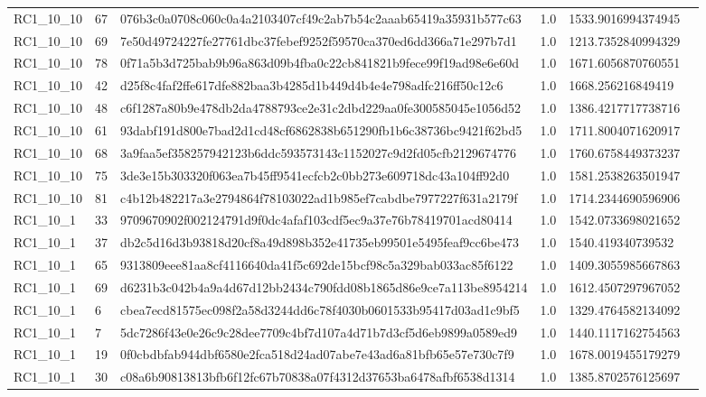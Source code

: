 \begin{tabular}{llllll}
 RC1\_10\_10 & 67 & 076b3c0a0708c060c0a4a2103407cf49c2ab7b54c2aaab65419a35931b577c63 & 1.0 & 1533.9016994374945 &  \\
 RC1\_10\_10 & 69 & 7e50d49724227fe27761dbc37febef9252f59570ca370ed6dd366a71e297b7d1 & 1.0 & 1213.7352840994329 &  \\
 RC1\_10\_10 & 78 & 0f71a5b3d725bab9b96a863d09b4fba0c22cb841821b9fece99f19ad98e6e60d & 1.0 & 1671.6056870760551 &  \\
 RC1\_10\_10 & 42 & d25f8c4faf2ffe617dfe882baa3b4285d1b449d4b4e4e798adfc216ff50c12c6 & 1.0 & 1668.256216849419 &  \\
 RC1\_10\_10 & 48 & c6f1287a80b9e478db2da4788793ce2e31c2dbd229aa0fe300585045e1056d52 & 1.0 & 1386.4217717738716 &  \\
 RC1\_10\_10 & 61 & 93dabf191d800e7bad2d1cd48cf6862838b651290fb1b6c38736bc9421f62bd5 & 1.0 & 1711.8004071620917 &  \\
 RC1\_10\_10 & 68 & 3a9faa5ef358257942123b6ddc593573143c1152027c9d2fd05cfb2129674776 & 1.0 & 1760.6758449373237 &  \\
 RC1\_10\_10 & 75 & 3de3e15b303320f063ea7b45ff9541ecfcb2c0bb273e609718dc43a104ff92d0 & 1.0 & 1581.2538263501947 &  \\
 RC1\_10\_10 & 81 & c4b12b482217a3e2794864f78103022ad1b985ef7cabdbe7977227f631a2179f & 1.0 & 1714.2344690596906 &  \\
 RC1\_10\_1 & 33 & 9709670902f002124791d9f0dc4afaf103cdf5ec9a37e76b78419701acd80414 & 1.0 & 1542.0733698021652 &  \\
 RC1\_10\_1 & 37 & db2c5d16d3b93818d20cf8a49d898b352e41735eb99501e5495feaf9cc6be473 & 1.0 & 1540.419340739532 &  \\
 RC1\_10\_1 & 65 & 9313809eee81aa8cf4116640da41f5c692de15bcf98c5a329bab033ac85f6122 & 1.0 & 1409.3055985667863 &  \\
 RC1\_10\_1 & 69 & d6231b3c042b4a9a4d67d12bb2434c790fdd08b1865d86e9ce7a113be8954214 & 1.0 & 1612.4507297967052 &  \\
 RC1\_10\_1 & 6 & cbea7ecd81575ec098f2a58d3244dd6c78f4030b0601533b95417d03ad1c9bf5 & 1.0 & 1329.4764582134092 &  \\
 RC1\_10\_1 & 7 & 5dc7286f43e0e26c9c28dee7709c4bf7d107a4d71b7d3cf5d6eb9899a0589ed9 & 1.0 & 1440.1117162754563 &  \\
 RC1\_10\_1 & 19 & 0f0cbdbfab944dbf6580e2fca518d24ad07abe7e43ad6a81bfb65e57e730c7f9 & 1.0 & 1678.0019455179279 &  \\
 RC1\_10\_1 & 30 & c08a6b90813813bfb6f12fc67b70838a07f4312d37653ba6478afbf6538d1314 & 1.0 & 1385.8702576125697 &  \\

\end{tabular}
